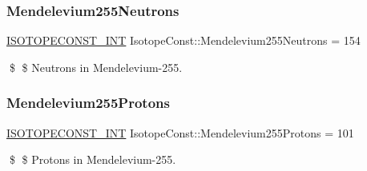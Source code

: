 \subsubsection{\texorpdfstring{Mendelevium255\+Neutrons}{Mendelevium255Neutrons}}
{\footnotesize\ttfamily \mbox{\hyperlink{group___isotope_const-_macros_ga5f18360b3e99483a35c32d789e62621c}{I\+S\+O\+T\+O\+P\+E\+C\+O\+N\+S\+T\+\_\+\+I\+NT}} Isotope\+Const\+::\+Mendelevium255\+Neutrons = 154}

\$ \$ Neutrons in Mendelevium-\/255. \mbox{\label{group___isotope_const-_mendelevium-_md255_gac9e0edd1325e83f725c2656e8084035b}} 
\subsubsection{\texorpdfstring{Mendelevium255\+Protons}{Mendelevium255Protons}}
{\footnotesize\ttfamily \mbox{\hyperlink{group___isotope_const-_macros_ga5f18360b3e99483a35c32d789e62621c}{I\+S\+O\+T\+O\+P\+E\+C\+O\+N\+S\+T\+\_\+\+I\+NT}} Isotope\+Const\+::\+Mendelevium255\+Protons = 101}

\$ \$ Protons in Mendelevium-\/255. 